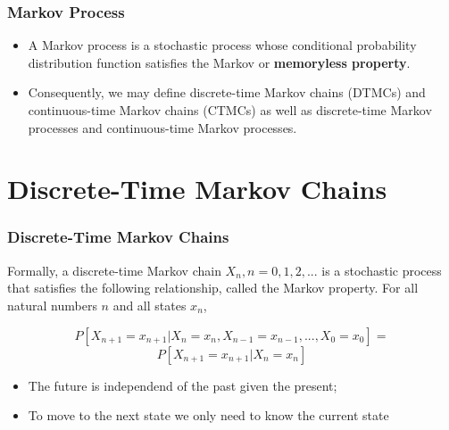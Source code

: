 \begin{frame}
    \frametitle{Markov Process}
    \begin{itemize}
        \item A Markov process is a stochastic process whose conditional probability 
        distribution function satisfies the Markov or \textbf{memoryless property}. 
        
        \item Consequently, we may define discrete-time Markov chains (DTMCs) and continuous-time 
        Markov chains (CTMCs) as well as discrete-time Markov processes and continuous-time Markov processes.
    \end{itemize}
\end{frame}


\section{Discrete-Time Markov Chains}


\begin{frame}
    \frametitle{Discrete-Time Markov Chains}

    \begin{definition}
        Formally, a discrete-time Markov chain ${X_n , n = 0, 1, 2,...}$ is a stochastic process that 
        satisfies the following relationship, called the Markov property.
        For all natural numbers $n$ and all states $x_n$,

        $$P[X_{n+1}=x_{n+1}|X_{n}=x_{n},X_{n-1}=x_{n-1},...,X_{0}=x_{0}] = $$
        $$P[X_{n+1}=x_{n+1}|X_{n}=x_{n}]$$
    \end{definition}


    \begin{itemize}
        \item The future is independend of the past given the present;
        \item {\color{red}To move to the next state we only need to know the current state}
    \end{itemize}

\end{frame}


